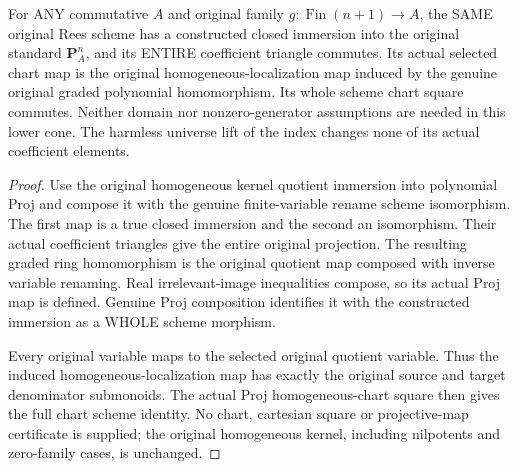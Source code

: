 \begin{lemma}
\label{scheme:actual-standard-rees-immersion}
For ANY commutative $A$ and original family $g:\operatorname{Fin}(n+1)\to A$,
the SAME original Rees scheme has a constructed closed immersion into the
original standard $\mathbf P^n_A$, and its ENTIRE coefficient triangle commutes.
Its actual selected chart map is the original homogeneous-localization map
induced by the genuine original graded polynomial homomorphism. Its whole
scheme chart square commutes. Neither domain nor nonzero-generator assumptions
are needed in this lower cone. The harmless universe lift of the index changes
none of its actual coefficient elements.
\leanok
\end{lemma}
\begin{proof}
Use the original homogeneous kernel quotient immersion into polynomial Proj
and compose it with the genuine finite-variable rename scheme isomorphism.
The first map is a true closed immersion and the second an isomorphism.
Their actual coefficient triangles give the entire original projection.
The resulting graded ring homomorphism is the original quotient map composed
with inverse variable renaming. Real irrelevant-image inequalities compose,
so its actual Proj map is defined. Genuine Proj composition identifies it with
the constructed immersion as a WHOLE scheme morphism.

Every original variable maps to the selected original quotient variable.
Thus the induced homogeneous-localization map has exactly the original source
and target denominator submonoids. The actual Proj homogeneous-chart square
then gives the full chart scheme identity. No chart, cartesian square or
projective-map certificate is supplied; the original homogeneous kernel,
including nilpotents and zero-family cases, is unchanged.
\end{proof}

